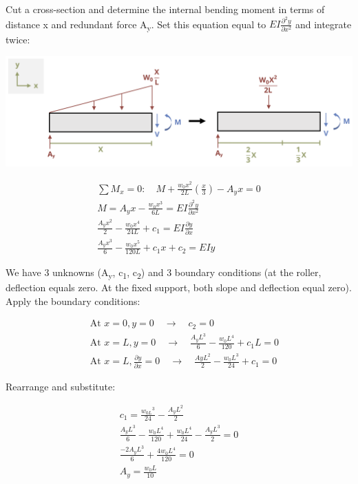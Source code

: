 \documentclass[
  letterpaper,
  DIV=11,
  numbers=noendperiod]{scrreprt}
\begin{document}
\begin{tcolorbox}
\begin{tcolorbox}
Cut a cross-section and determine the internal bending moment in terms
of distance x and redundant force A\textsubscript{y}. Set this equation
equal to \(EI\frac{\partial^2 y}{\partial x^2}\) and integrate twice:

\begin{center}
\includegraphics{images/CH11 PNGs/example11.6-3.png}
\end{center}

\[
\begin{gathered} \sum M_x=0: \quad M+\frac{w_0 x^2}{2 L}\left(\frac{x}{3}\right)-A_y x=0 \\ M=A_y x-\frac{w_0 x^3}{6 L}=EI \frac{\partial^2 y}{\partial x^2} \\ \frac{A_y x^2}{2}-\frac{w_0 x^4}{24 L}+c_1=E I \frac{\partial y}{\partial x} \\ \frac{A_y x^3}{6}-\frac{w_0 x^5}{120 L}+c_1 x+c_2=E I y\end{gathered}
\]

We have 3 unknowns (A\textsubscript{y}, c\textsubscript{1},
c\textsubscript{2}) and 3 boundary conditions (at the roller, deflection
equals zero. At the fixed support, both slope and deflection equal
zero). Apply the boundary conditions:

\[
\begin{aligned} & \text { At } x=0, y=0 \quad \rightarrow \quad c_2=0 \\ & \text { At } x=L, y=0 \quad \rightarrow \quad \frac{A_y L^3}{6}-\frac{w_0 L^4}{120}+c_1 L=0 \\ & \text { At } x=L, \frac{\partial y}{\partial x}=0 \quad \rightarrow \quad \frac{A y L^2}{2}-\frac{w_0 L^3}{24}+c_1=0\end{aligned}
\]

Rearrange and substitute:

\[
\begin{gathered}c_1=\frac{w_{0 L}{ }^3}{24}-\frac{A_y L^2}{2} \\ \frac{A_y L^3}{6}-\frac{w_0 L^4}{120}+\frac{w_0 L^4}{24}-\frac{A_y L^3}{2}=0 \\ \frac{-2 A_y L^3}{6}+\frac{4 w_{0} L^4}{120}=0 \\ A_y=\frac{w_0 L}{10}\end{gathered}
\]


\end{tcolorbox}
\end{tcolorbox}
\end{document}
